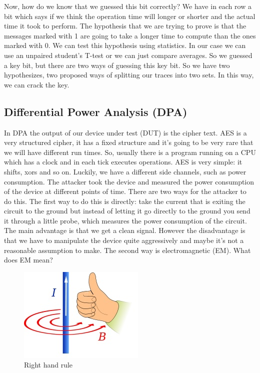Now, how do we know that we guessed this bit correctly? We have in each row a
bit which says if we think the operation time will longer or shorter and the actual time it took to perform. The
hypothesis that we are trying to prove is that the messages marked with 1 are going to take a longer time to compute than the ones marked with 0. We can test this
hypothesis using statistics. In our case we can use an unpaired student's T-test or we can just compare averages. So we guessed a key bit, but there are two ways of guessing this key bit. So we have two hypothesizes, two proposed ways of splitting our traces into two sets. In this way, we can crack the key.

\subsection{Differential Power Analysis (DPA)}\label{c8_prev_lectures_recap_dpa_sc:subsec}

In DPA the output of our device under test (DUT) is the cipher text. AES is a
very structured cipher, it has a fixed structure and it's going to be very rare
that we will have different run times. So, usually there is a program running on a CPU which has a clock and in each tick executes operations. AES is very
simple: it shifts, xors and so on. Luckily, we have a different side channels, such as
power consumption. The attacker took the device and measured the power consumption of the device at different points of time. There are two ways for the attacker to do this. The
first way to do this is directly: take the current that is exiting the circuit to the ground but instead of letting it go directly to the ground you send it
through a little probe, which measures the power consumption of the circuit.
The main advantage is that we get a clean signal. However the disadvantage is that we have to manipulate the device quite aggressively and maybe it's not a
reasonable assumption to make. The second way is electromagnetic (EM). What does
EM mean? 

\begin{figure}[!ht]
    \centering
    \includegraphics{images/chapter8/right_hand_rule.jpeg}
    \caption{Right hand rule} \label{c8_right_hand_rule:fig}
\end{figure}


